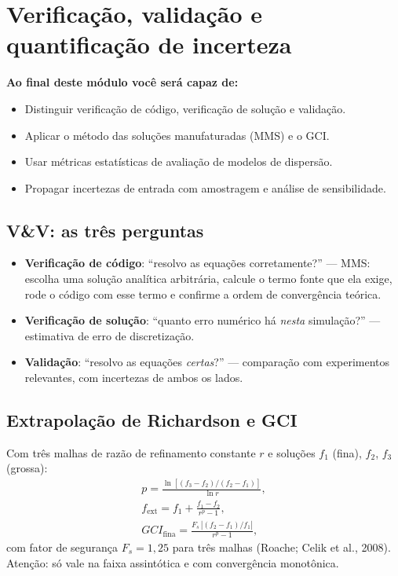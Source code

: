 \documentclass[10pt,a4paper,twocolumn,openany]{report}
\newenvironment{conceito}[1]{\section{#1}}{\par}
\newcommand{\objetivos}{\noindent\textbf{Ao final deste módulo você será capaz de:}}
\begin{document}
\chapter{Verificação, validação e quantificação de incerteza}

\objetivos
\begin{itemize}
  \item Distinguir verificação de código, verificação de solução e validação.
  \item Aplicar o método das soluções manufaturadas (MMS) e o GCI.
  \item Usar métricas estatísticas de avaliação de modelos de dispersão.
  \item Propagar incertezas de entrada com amostragem e análise de sensibilidade.
\end{itemize}

\begin{conceito}{V\&V: as três perguntas}
\begin{itemize}
  \item \textbf{Verificação de código}: ``resolvo as equações corretamente?''
        --- MMS: escolha uma solução analítica arbitrária, calcule o termo
        fonte que ela exige, rode o código com esse termo e confirme a ordem
        de convergência teórica.
  \item \textbf{Verificação de solução}: ``quanto erro numérico há \emph{nesta}
        simulação?'' --- estimativa de erro de discretização.
  \item \textbf{Validação}: ``resolvo as equações \emph{certas}?'' ---
        comparação com experimentos relevantes, com incertezas de ambos os lados.
\end{itemize}
\end{conceito}

\begin{conceito}{Extrapolação de Richardson e GCI}
Com três malhas de razão de refinamento constante $r$ e soluções
$f_1$ (fina), $f_2$, $f_3$ (grossa):
\begin{gather*}
  p=\frac{\ln\left[(f_3-f_2)/(f_2-f_1)\right]}{\ln r},\\
  f_{\text{ext}}=f_1+\frac{f_1-f_2}{r^p-1},\\
  GCI_{\text{fina}}=\frac{F_s\,|(f_2-f_1)/f_1|}{r^p-1},
\end{gather*}
com fator de segurança $F_s=1{,}25$ para três malhas (Roache; Celik et al.,
2008). Atenção: só vale na faixa assintótica e com convergência monotônica.
\end{conceito}
\end{document}
